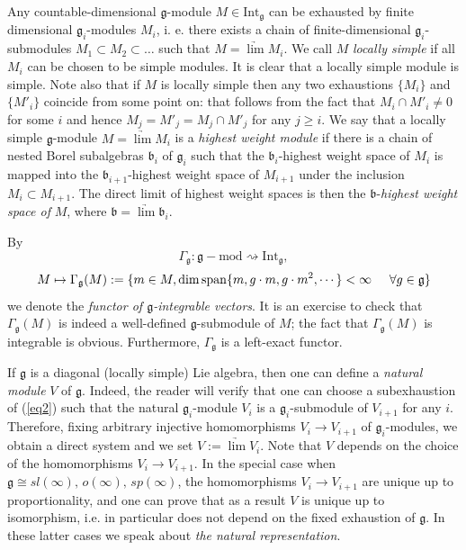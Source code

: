 \documentclass{birkmult}
\renewcommand{\gg}{\mathfrak{g}}
\newcommand{\bb}{\mathfrak{b}}
\newcommand{\refeq}[1]{(\ref{#1})}
\renewcommand{\span}{\mathrm{span}}
\newcommand{\ds}{\displaystyle}
\newcommand{\Int}{\mathrm{Int}}
\begin{document}
Any countable-dimensional $\gg$-module $M\in\Int_{\gg}$ can be
exhausted by finite dimensional $\gg_i$-modules $M_i$, i. e. there
exists a chain of finite-dimensional $\gg_i$-submodules
$M_1\subset M_2\subset\dots$ such that $\ds
M=\underrightarrow{\lim}M_i$. We call $M$ {\it locally simple} if
all $M_i$ can be chosen to be simple modules. It is clear that a
locally simple module is simple. Note also that if $M$ is locally
simple then any two exhaustions $\{M_i\}$ and $\{M'_i\}$ coincide
from some point on: that follows from the fact that $M_i\cap
M'_i\neq 0$ for some $i$ and hence $M_j=M'_j=M_j\cap M'_j$ for any
$j\geq i$. We say that a locally simple $\gg$-module $\ds
M=\underrightarrow{\lim}M_i$ is a \emph{highest weight module} if
there is a chain of nested Borel subalgebras $\bb_i$ of $\gg_i$
such that the $\bb_i$-highest weight space of $M_i$ is mapped into
the $\bb_{i+1}$-highest weight space of $M_{i+1}$ under the
inclusion $M_i\subset M_{i+1}$. The direct limit of highest weight
spaces is then the $\bb$-\emph{highest weight space of} $M$, where
$\ds \bb=\underrightarrow{\lim}\bb_i$.

By $$\ds\Gamma_{\gg}:\gg-\mathrm{mod} \rightsquigarrow\Int_\gg,$$
$$ M\mapsto\Gamma_{\gg}(M):=\{m\in M, \dim\span\{m, g\cdot m,
g\cdot m^2,\cdots\}<\infty \hspace{0.5 cm} \forall g\in\gg \}$$ we
denote the \textit{functor of $\gg$-integrable vectors}. It is an
exercise to check that $\Gamma_{\gg}(M)$ is indeed a well-defined
$\gg$-submodule of $M$; the fact that $\Gamma_{\gg}(M)$ is
integrable is obvious. Furthermore, $\Gamma_{\gg}$ is a left-exact
functor.

If $\gg$ is a diagonal (locally simple) Lie algebra, then one can
define a {\it natural module} $V$ of $\gg$. Indeed, the reader
will verify that one can choose a subexhaustion of \refeq{eq2}
such that the natural $\gg_i$-module $V_i$ is a $\gg_i$-submodule
of $V_{i+1}$ for any $i$. Therefore, fixing arbitrary injective
homomorphisms $V_i\to V_{i+1}$ of $\gg_i$-modules, we obtain a
direct system and we set $V:=\underrightarrow{\lim}V_i$. Note that
$V$ depends on the choice of the homomorphisms $V_i\to V_{i+1}$.
In the special case when $\gg\cong sl(\infty),\,o(\infty),\,sp(\infty)$,
the homomorphisms $V_i\to V_{i+1}$ are unique up to
proportionality, and one can prove that as a result $V$ is unique
up to isomorphism, i.e. in particular does not depend on the fixed
exhaustion of $\gg$. In these latter cases we speak about
\emph{the natural representation}.
\end{document}
